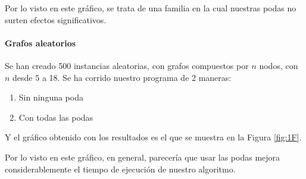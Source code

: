 Por lo visto en este gráfico, se trata de una familia en la cual nuestras podas no surten efectos significativos.

\paragraph{Grafos aleatorios}

Se han creado 500 instancias aleatorias, con grafos compuestos por $n$ nodos, con $n$ desde 5 a 18. Se ha corrido nuestro programa de 2 maneras:

\begin{enumerate}
	\item Sin ninguna poda
	\item Con todas las podas 
\end{enumerate}

Y el gráfico obtenido con los resultados es el que se muestra en la Figura \ref{fig:1F}.
%

Por lo visto en este gráfico, en general, parecería que usar las podas mejora considerablemente el tiempo de ejecución de nuestro algoritmo.